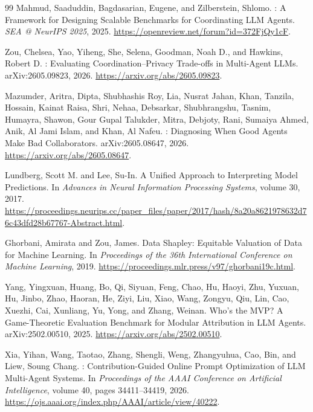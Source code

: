 \begin{thebibliography}{99}
Mahmud, Saaduddin, Bagdasarian, Eugene, and Zilberstein, Shlomo.
: A Framework for Designing Scalable Benchmarks for Coordinating LLM Agents.
\newblock \emph{SEA @ NeurIPS 2025}, 2025.
\newblock \url{https://openreview.net/forum?id=372FjQy1cF}.

Zou, Chelsea, Yao, Yiheng, She, Selena, Goodman, Noah D., and Hawkins, Robert D.
: Evaluating Coordination--Privacy Trade-offs in Multi-Agent LLMs.
\newblock arXiv:2605.09823, 2026.
\newblock \url{https://arxiv.org/abs/2605.09823}.

Mazumder, Aritra, Dipta, Shubhashis Roy, Lia, Nusrat Jahan, Khan, Tanzila, Hossain, Kainat Raisa, Shri, Nehaa, Debsarkar, Shubhrangshu, Tasnim, Humayra, Shawon, Gour Gupal Talukder, Mitra, Debjoty, Rani, Sumaiya Ahmed, Anik, Al Jami Islam, and Khan, Al Nafeu.
: Diagnosing When Good Agents Make Bad Collaborators.
\newblock arXiv:2605.08647, 2026.
\newblock \url{https://arxiv.org/abs/2605.08647}.

Lundberg, Scott M. and Lee, Su-In.
\newblock A Unified Approach to Interpreting Model Predictions.
\newblock In \emph{Advances in Neural Information Processing Systems}, volume 30, 2017.
\newblock \url{https://proceedings.neurips.cc/paper_files/paper/2017/hash/8a20a8621978632d76c43dfd28b67767-Abstract.html}.

Ghorbani, Amirata and Zou, James.
\newblock Data Shapley: Equitable Valuation of Data for Machine Learning.
\newblock In \emph{Proceedings of the 36th International Conference on Machine Learning}, 2019.
\newblock \url{https://proceedings.mlr.press/v97/ghorbani19c.html}.

Yang, Yingxuan, Huang, Bo, Qi, Siyuan, Feng, Chao, Hu, Haoyi, Zhu, Yuxuan, Hu, Jinbo, Zhao, Haoran, He, Ziyi, Liu, Xiao, Wang, Zongyu, Qiu, Lin, Cao, Xuezhi, Cai, Xunliang, Yu, Yong, and Zhang, Weinan.
\newblock Who's the MVP? A Game-Theoretic Evaluation Benchmark for Modular Attribution in LLM Agents.
\newblock arXiv:2502.00510, 2025.
\newblock \url{https://arxiv.org/abs/2502.00510}.

Xia, Yihan, Wang, Taotao, Zhang, Shengli, Weng, Zhangyuhua, Cao, Bin, and Liew, Soung Chang.
: Contribution-Guided Online Prompt Optimization of LLM Multi-Agent Systems.
\newblock In \emph{Proceedings of the AAAI Conference on Artificial Intelligence}, volume 40, pages 34411--34419, 2026.
\newblock \url{https://ojs.aaai.org/index.php/AAAI/article/view/40222}.


\end{thebibliography}
